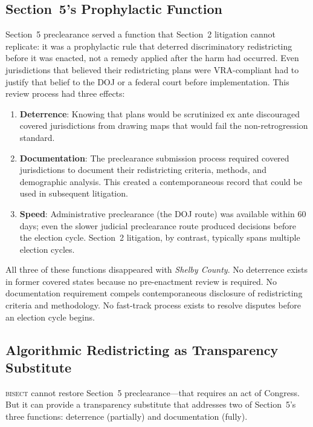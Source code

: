 \label{sec:legal}

\subsection{Section~5's Prophylactic Function}

Section~5 preclearance served a function that Section~2 litigation
cannot replicate: it was a prophylactic rule that deterred discriminatory
redistricting before it was enacted, not a remedy applied after the harm
had occurred. Even jurisdictions that believed their redistricting plans
were VRA-compliant had to justify that belief to the DOJ or a federal
court before implementation. This review process had three effects:

\begin{enumerate}
\item \textbf{Deterrence}: Knowing that plans would be scrutinized
  ex ante discouraged covered jurisdictions from drawing maps that
  would fail the non-retrogression standard.

\item \textbf{Documentation}: The preclearance submission process
  required covered jurisdictions to document their redistricting
  criteria, methods, and demographic analysis. This created a
  contemporaneous record that could be used in subsequent litigation.

\item \textbf{Speed}: Administrative preclearance (the DOJ route)
  was available within 60 days; even the slower judicial preclearance
  route produced decisions before the election cycle. Section~2
  litigation, by contrast, typically spans multiple election cycles.
\end{enumerate}

All three of these functions disappeared with \textit{Shelby County}.
No deterrence exists in former covered states because no pre-enactment
review is required. No documentation requirement compels contemporaneous
disclosure of redistricting criteria and methodology. No fast-track
process exists to resolve disputes before an election cycle begins.

\subsection{Algorithmic Redistricting as Transparency Substitute}

\textsc{bisect} cannot restore Section~5 preclearance---that requires
an act of Congress. But it can provide a transparency substitute that
addresses two of Section~5's three functions: deterrence (partially)
and documentation (fully).

